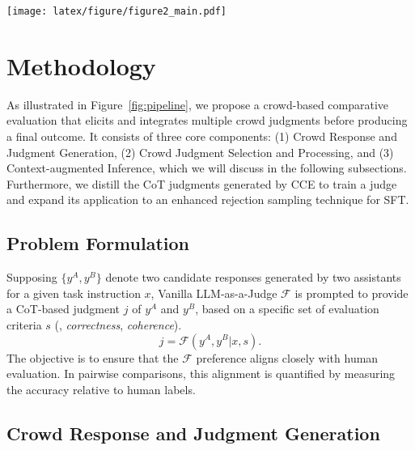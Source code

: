 \begin{figure*}[!t]
  \texttt{[image: latex/figure/figure2\_main.pdf]}
  \caption {\textbf{Pipeline of our proposed crowd-based comparative evaluation.} For a given instance $(x, y^A, y^B)$, we first use the LLM to generate crowd responses $\left\{y^i|i\in\{C,D,E,...\}\right\}$ based on $x$. These responses are then compared with $y^A$ and $y^B$ to produce initial crowd judgments $\mathcal{J}$, which are subsequently refined into $\hat{\mathcal{J}}$ after selection and processing. Finally, $\hat{\mathcal{J}}$ are used as contextual input to evaluate the instance $(x, y^A, y^B)$.} 
  \label{fig:pipeline}
\end{figure*}

\section{Methodology}
\label{sec:method}


As illustrated in Figure~\ref{fig:pipeline}, we propose a crowd-based comparative evaluation that elicits and integrates multiple crowd judgments before producing a final outcome.
It consists of three core components: (1) Crowd Response and Judgment Generation, (2) Crowd Judgment Selection and Processing, and (3) Context-augmented Inference,  which we will discuss in the following subsections. Furthermore, we distill the CoT judgments generated by \textsc{CCE} to train a judge and expand its application to an enhanced rejection sampling technique for SFT.

\subsection{Problem Formulation}
\label{subsec:problem}
Supposing $\{y^A, y^B\}$ denote two candidate responses generated by two assistants for a given task instruction $x$, Vanilla LLM-as-a-Judge $\mathcal{F}$ is prompted to provide a CoT-based judgment $j$ of $y^A$ and $y^B$, based on a specific set of evaluation criteria $s$ 
(\eg, \textit{correctness}, \textit{coherence}).
\begin{equation}
    j = \mathcal{F}(y^A, y^B|x,s).
\end{equation}
The objective is to ensure that the $\mathcal{F}$ preference aligns closely with human evaluation. In pairwise comparisons, this alignment is quantified by measuring the accuracy relative to human labels.

\subsection{Crowd Response and Judgment Generation}
\label{subsec:crowd}


